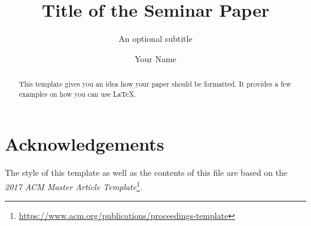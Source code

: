 \documentclass[sigconf,natbib=false]{acmart}
\begin{document}

\title{Title of the Seminar Paper}
\subtitle{An optional subtitle}

\author{Your Name}


\begin{abstract}
This template gives you an idea how your paper should be formatted. It provides
a few examples on how you can use \LaTeX.
\end{abstract}



\maketitle

 



\section{Acknowledgements}
The style of this template as well as the contents of this file are based on the
\textit{2017 ACM Master Article
Template}\footnote{\url{https://www.acm.org/publications/proceedings-template}}.



{\small

%


}
\end{document}
